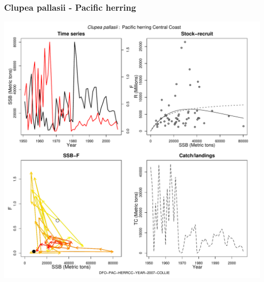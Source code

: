 \subsubsection{Clupea pallasii - Pacific herring}
\begin{center}
\includegraphics[width=1.2\textwidth]{../R/figures/DFO-PAC-HERRCC-YEAR-2007-COLLIE.pdf}
\end{center}

